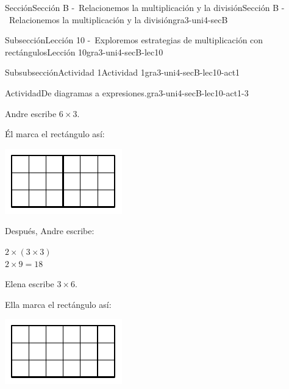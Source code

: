 \documentclass[twoside,10pt,]{article}
\begin{document}
\begin{sectionptx}{Sección}{Sección B -~Relacionemos la multiplicación y la división}{}{Sección B -~Relacionemos la multiplicación y la división}{}{}{gra3-uni4-secB}
\begin{subsectionptx}{Subsección}{Lección 10 -~Exploremos estrategias de multiplicación con rectángulos}{}{Lección 10}{}{}{gra3-uni4-secB-lec10}
\begin{subsubsectionptx}{Subsubsección}{Actividad 1}{}{Actividad 1}{}{}{gra3-uni4-secB-lec10-act1}
\begin{activity}{Actividad}{De diagramas a expresiones.}{gra3-uni4-secB-lec10-act1-3}
\begin{sidebyside}{3}{0}{0}{0.065}%
\begin{sbspanel}{0.27}%
Andre escribe \(6\times 3\).%
\end{sbspanel}%
\begin{sbspanel}{0.35}%
Él marca el rectángulo así:%
\par
\includegraphics[width=\linewidth]{external/svg-source/tikz-file-153044.pdf}
\end{sbspanel}%
\begin{sbspanel}{0.25}%
Después, Andre escribe:%
\par
\(2 \times (3 \times 3)\)\\
 \(2 \times 9 = 18\)%
\end{sbspanel}%
\end{sidebyside}%
\begin{sidebyside}{3}{0}{0}{0.065}%
\begin{sbspanel}{0.27}%
Elena escribe \(3\times 6\).%
\end{sbspanel}%
\begin{sbspanel}{0.35}%
Ella marca el rectángulo así:%
\par
\includegraphics[width=\linewidth]{external/svg-source/tikz-file-153045.pdf}

\end{sbspanel}
\end{sidebyside}
\end{activity}
\end{subsubsectionptx}
\end{subsectionptx}
\end{sectionptx}
\end{document}
